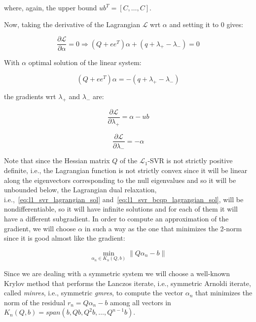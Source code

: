 where, again, the upper bound $ub^T = [C, \dots, C]$.

Now, taking the derivative of the Lagrangian $\mathcal{L}$ wrt $\alpha$ and setting it to 0 gives:

\begin{equation} \label{eq:l1_svr_bcqp_lagrangian_der_a}
	\frac{\partial \mathcal{L}}{\partial \alpha}=0\Rightarrow (Q + ee^T) \alpha + (q + \lambda_+ - \lambda_-) = 0
\end{equation}

With $\alpha$ optimal solution of the linear system:

\begin{equation} \label{eq:l1_svr_bcqp_lagrangian_sol}
    (Q + ee^T) \alpha = - (q + \lambda_+ - \lambda_-)
\end{equation}

the gradients wrt $\lambda_+$ and $\lambda_-$ are:

\begin{equation} \label{eq:l1_svr_bcqp_lagrangian_der_lp}
	\frac{\partial \mathcal{L}}{\partial \lambda_+}=\alpha - ub
\end{equation}

\begin{equation} \label{eq:l1_svr_bcqp_lagrangian_der_lm}
    \frac{\partial \mathcal{L}}{\partial \lambda_-}=-\alpha
\end{equation}

\bigskip

Note that since the Hessian matrix $Q$ of the $\mathcal{L}_1$-SVR is not strictly positive definite, i.e., the Lagrangian function is not strictly convex since it will be linear along the eigenvectors corresponding to the null eigenvalues and so it will be unbounded below, the Lagrangian dual relaxation, i.e.,~\ref{eq:l1_svr_lagrangian_sol} and~\ref{eq:l1_svr_bcqp_lagrangian_sol}, will be nondifferentiable, so it will have infinite solutions and for each of them it will have a different subgradient. In order to compute an approximation of the gradient, we will choose $\alpha$ in such a way as the one that minimizes the 2-norm since it is good almost like the gradient:

\begin{equation} \label{eq:svr_lagrangian_krylov_sol}
	\min_{\alpha_n \in K_n(Q, b)} \| Q \alpha_n - b \|
\end{equation}

Since we are dealing with a symmetric system we will choose a well-known Krylov method that performs the Lanczos iterate, i.e., symmetric Arnoldi iterate, called \emph{minres}, i.e., symmetric \emph{gmres}, to compute the vector $\alpha_n$ that minimizes the norm of the residual $r_n = Q \alpha_n - b$ among all vectors in $K_n(Q, b) = span(b, Qb, Q^2b, \dots, Q^{n-1}b)$.

